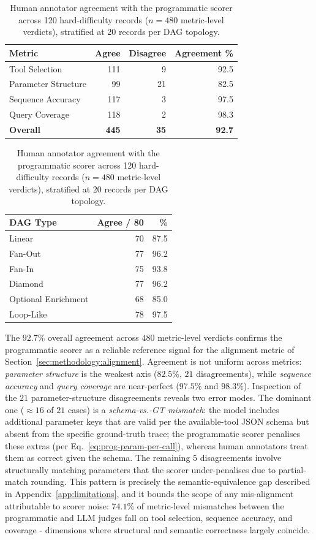 \begin{table}[!htbp]
\centering
\small
\setlength{\tabcolsep}{6pt}
\renewcommand{\arraystretch}{1.15}
\caption{Human annotator agreement with the programmatic scorer across 120 hard-difficulty records ($n{=}480$ metric-level verdicts), stratified at 20 records per DAG topology.}
\label{tab:prog-judge-agree}
\begin{tabularx}{0.75\textwidth}{@{}Xrrr@{}}
\toprule
\textbf{Metric} & \textbf{Agree} & \textbf{Disagree} & \textbf{Agreement \%} \\
\midrule
Tool Selection          & 111 &  9 & 92.5 \\
Parameter Structure     &  99 & 21 & 82.5 \\
Sequence Accuracy       & 117 &  3 & 97.5 \\
Query Coverage          & 118 &  2 & 98.3 \\
\midrule
\textbf{Overall}        & \textbf{445} & \textbf{35} & \textbf{92.7} \\
\bottomrule
\end{tabularx}

\vspace{0.5em}
\begin{tabularx}{0.75\textwidth}{@{}Xrr@{}}
\toprule
\textbf{DAG Type} & \textbf{Agree / 80} & \textbf{\%} \\
\midrule
Linear              & 70 & 87.5 \\
Fan-Out             & 77 & 96.2 \\
Fan-In              & 75 & 93.8 \\
Diamond             & 77 & 96.2 \\
Optional Enrichment & 68 & 85.0 \\
Loop-Like           & 78 & 97.5 \\
\bottomrule
\end{tabularx}
\end{table}
The $92.7\%$ overall agreement across $480$ metric-level verdicts confirms the programmatic scorer as a reliable reference signal for the alignment metric of Section~\ref{sec:methodology:alignment}. Agreement is not uniform across metrics: \emph{parameter structure} is the weakest axis ($82.5\%$, $21$ disagreements), while \emph{sequence accuracy} and \emph{query coverage} are near-perfect ($97.5\%$ and $98.3\%$). Inspection of the $21$ parameter-structure disagreements reveals two error modes. The dominant one (${\approx}16$ of $21$ cases) is a \emph{schema-vs.-GT mismatch}: the model includes additional parameter keys that are valid per the available-tool JSON schema but absent from the specific ground-truth trace; the programmatic scorer penalises these extras (per Eq.~\ref{eq:prog-param-per-call}), whereas human annotators treat them as correct given the schema. The remaining $5$ disagreements involve structurally matching parameters that the scorer under-penalises due to partial-match rounding. This pattern is precisely the semantic-equivalence gap described in Appendix~\ref{app:limitations}, and it bounds the scope of any mis-alignment attributable to scorer noise: $74.1\%$ of metric-level mismatches between the programmatic and LLM judges fall on tool selection, sequence accuracy, and coverage - dimensions where structural and semantic correctness largely coincide.

